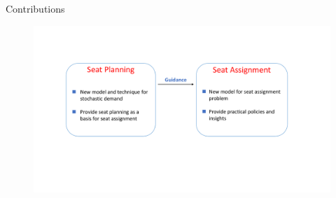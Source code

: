     \begin{frame}{Contributions}


        
        


      
\begin{figure}[h]
        \centering
        \includegraphics[width=1\textwidth]{./images/contribution.pdf}          
        \end{figure}
    \end{frame}